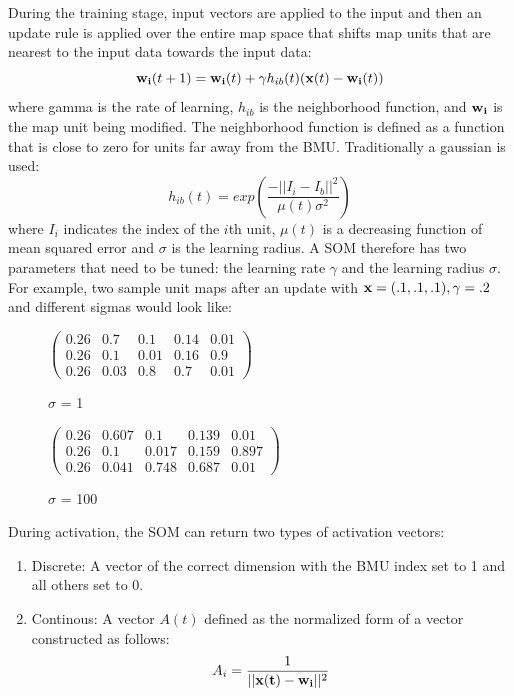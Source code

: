 \documentclass[a4paper,10pt]{article}
\begin{document}
During the training stage, input vectors are applied to the input and then an
update rule is applied over the entire map space that shifts map units that are nearest to the
input data towards the input data:
\begin{equation} \label{eq:UPDATE}
 \bold{w_{i}}(t+1) = \bold{w_i}(t) + \gamma h_{ib}(t)(\bold{x}(t)-\bold{w_i}(t))
\end{equation}
where gamma is the rate of learning, $h_{ib}$ is the neighborhood function, and $\bold{w_i}$ is the
map unit being modified.  The neighborhood function is defined as a function that is close to zero
for units far away from the BMU.  Traditionally a gaussian is used:
\begin{equation} \label{eq:GAUSSIAN}
 h_{ib}(t) = exp(\frac{-||I_i-I_b||^2}{\mu(t)\sigma^2})
\end{equation}
where $I_i$ indicates the index of the $i$th unit, $\mu(t)$ is a decreasing function of mean
squared error and $\sigma$ is the learning radius.  A SOM therefore has two parameters that need to
be tuned: the learning rate $\gamma$ and the learning radius $\sigma$. For example, two sample unit
maps after an update with $\bold{x}=(.1,.1,.1), \gamma=.2$ and different sigmas would look like:
\begin{figure}[h]
\begin{center}
$
\begin{pmatrix}
0.26 &  0.7 &  0.1 &  0.14  & 0.01 \\
0.26  & 0.1  & 0.01 & 0.16 & 0.9  \\
0.26  & 0.03 & 0.8  & 0.7  & 0.01
\end{pmatrix}$
\caption{$\sigma$ = 1}
\centering
$\begin{pmatrix}
0.26 &  0.607 &  0.1 &  0.139  & 0.01 \\
0.26  & 0.1  & 0.017 & 0.159 & 0.897  \\
0.26  & 0.041 & 0.748  & 0.687  & 0.01
\end{pmatrix}
$
\caption{$\sigma$ = 100}
\end{center}
\end{figure}

During activation, the SOM can return two types of activation vectors:
\begin{enumerate}
\item Discrete: A vector of the correct dimension with the BMU index set to 1 and all others set
to 0.
\item Continous: A vector $A(t)$ defined as the normalized form of a vector constructed as follows:
\begin{equation}
 A_i = \frac{1}{||\bold{x(t)} - \bold{w_i}||^2}
\end{equation}
\end{enumerate}
\end{document}
